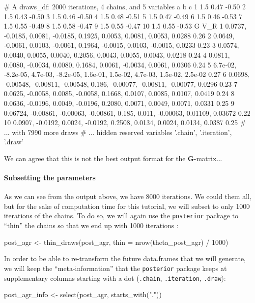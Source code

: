 \documentclass[a4paper,12pt,twoside]{article}
\begin{document}
\begin{Routput}
# A draws_df: 2000 iterations, 4 chains, and 5 variables
     a    b     c
1  1.5 0.47 -0.50
2  1.5 0.43 -0.50
3  1.5 0.46 -0.50
4  1.5 0.48 -0.51
5  1.5 0.47 -0.49
6  1.5 0.46 -0.53
7  1.5 0.55 -0.49
8  1.5 0.58 -0.47
9  1.5 0.55 -0.47
10 1.5 0.55 -0.53
                                                                                  G  V_R
1          0.0737, -0.0185, 0.0081, -0.0185, 0.1925, 0.0053, 0.0081, 0.0053, 0.0288 0.26
2        0.0649, -0.0061, 0.0103, -0.0061, 0.1964, -0.0015, 0.0103, -0.0015, 0.0233 0.23
3            0.0574, 0.0040, 0.0055, 0.0040, 0.2056, 0.0043, 0.0055, 0.0043, 0.0218 0.24
4          0.0811, 0.0080, -0.0034, 0.0080, 0.1684, 0.0061, -0.0034, 0.0061, 0.0306 0.24
5 6.7e-02, -8.2e-05, 4.7e-03, -8.2e-05, 1.6e-01, 1.5e-02, 4.7e-03, 1.5e-02, 2.5e-02 0.27
6 0.0698, -0.00548, -0.00811, -0.00548, 0.186, -0.00077, -0.00811, -0.00077, 0.0296 0.23
7          0.0625, -0.0058, 0.0085, -0.0058, 0.1668, 0.0107, 0.0085, 0.0107, 0.0419 0.24
8          0.0636, -0.0196, 0.0049, -0.0196, 0.2080, 0.0071, 0.0049, 0.0071, 0.0331 0.25
9   0.06724, -0.00861, -0.00063, -0.00861, 0.185, 0.011, -0.00063, 0.01109, 0.03672 0.22
10         0.0907, -0.0192, 0.0024, -0.0192, 0.2508, 0.0134, 0.0024, 0.0134, 0.0387 0.25
# ... with 7990 more draws
# ... hidden reserved variables {'.chain', '.iteration', '.draw'}
\end{Routput}
We can agree that this is not the best output format for the $\mathbf{G}$-matrix...

\paragraph{Subsetting the parameters}
As we can see from the output above, we have 8000 iterations. We could them all, but for the sake of computation time for this tutorial, we will subset to only 1000 iterations of the chains. To do so, we will again use the \texttt{posterior} package to ``thin'' the chains so that we end up with 1000 iterations :
\begin{Rinput}
post_agr <- thin_draws(post_agr, thin = nrow(theta_post_agr) / 1000)
\end{Rinput}
In order to be able to re-transform the future data.frames that we will generate, we will keep the ``meta-information'' that the \texttt{posterior} package keeps at supplementary columns starting with a dot (\texttt{.chain}, \texttt{.iteration}, \texttt{.draw}):
\begin{Rinput}
post_agr_info <- select(post_agr, starts_with("."))
\end{Rinput}
\end{document}
